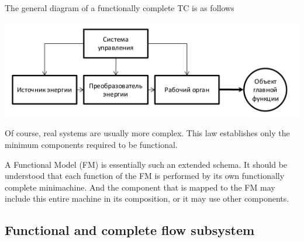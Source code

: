 \documentclass[a4paper,11pt]{article}
\begin{document}
The general diagram of a functionally complete TC is as follows
\begin{center}
  \includegraphics[width=.8\textwidth]{1.png}
\end{center}

Of course, real systems are usually more complex. This law establishes only
the minimum components required to be functional.

A Functional Model (FM) is essentially such an extended schema. It should be
understood that each function of the FM is performed by its own functionally
complete minimachine. And the component that is mapped to the FM may include
this entire machine in its composition, or it may use other components.

\subsection{Functional and complete flow subsystem}
\end{document}
